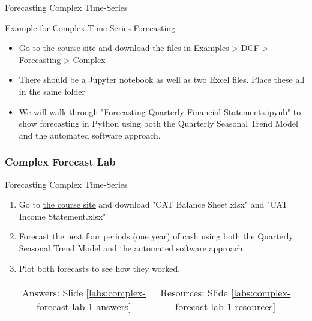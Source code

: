 \documentclass[handout, 11pt]{beamer}
\begin{document}
\begin{section}{Forecasting Complex Time-Series}
\begin{frame}
{\begin{block}{Example for Complex Time-Series Forecasting}
\begin{itemize}
\item Go to the course site and download the files in Examples > DCF > Forecasting > Complex
\item There should be a Jupyter notebook as well as two Excel files. Place these all in the same folder
\item We will walk through "Forecasting Quarterly Financial Statements.ipynb" to show forecasting in Python using both the Quarterly Seasonal Trend Model and the automated software approach.
\end{itemize}
\end{block}
}
\end{frame}
\begin{frame}
\frametitle{Complex Forecast Lab}
{
\begin{block}{Forecasting Complex Time-Series}
\begin{enumerate}
\item Go to
\textcolor{blue}{\underline{\href{https://nickderobertis.github.io/fin-model-course/}{the course site}}}
and download "CAT Balance Sheet.xlsx" and "CAT Income Statement.xlsx"
\item Forecast the next four periods (one year) of cash using both the Quarterly Seasonal Trend Model and the automated software approach.
\item Plot both forecasts to see how they worked.
\end{enumerate}
\vfill
\begin{tabular*}{\textwidth}{@{\extracolsep{\fill}}cccc}
\toprule
\hfill & Answers: Slide \textcolor{blue}{\underline{\ref{labs:complex-forecast-lab-1-answers}}} & Resources: Slide \textcolor{blue}{\underline{\ref{labs:complex-forecast-lab-1-resources}}} & \hfill\\

\end{tabular*}
\end{block}
}
\label{labs:complex-forecast-lab-1}
\end{frame}
\end{section}
\end{document}

